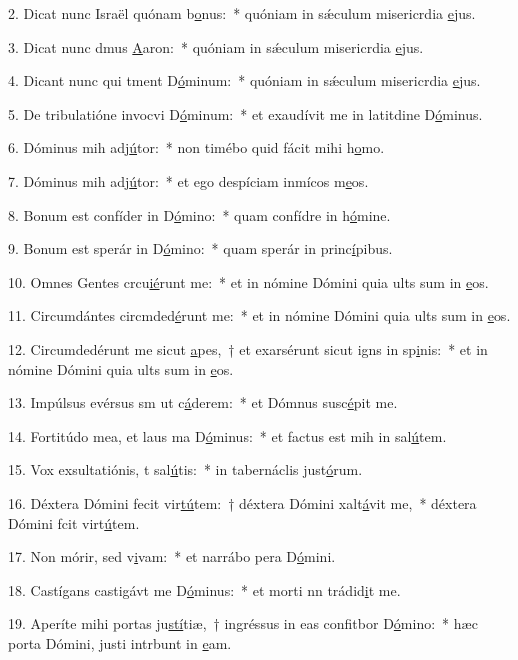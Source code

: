 2. Dicat nunc Israël quónam b\uline{o}nus:~* quóniam in sǽculum misericrdia \uline{e}jus.\par 
3. Dicat nunc dmus \uline{A}aron:~* quóniam in sǽculum misericrdia \uline{e}jus.\par 
4. Dicant nunc qui tment D\uline{ó}minum:~* quóniam in sǽculum misericrdia \uline{e}jus.\par 
5. De tribulatióne invocvi D\uline{ó}minum:~* et exaudívit me in latitdine D\uline{ó}minus.\par 
6. Dóminus mih adj\uline{ú}tor:~* non timébo quid fácit mihi h\uline{o}mo.\par 
7. Dóminus mih adj\uline{ú}tor:~* et ego despíciam inmícos m\uline{e}os.\par 
8. Bonum est confíder in D\uline{ó}mino:~* quam confídre in h\uline{ó}mine.\par 
9. Bonum est sperár in D\uline{ó}mino:~* quam sperár in princ\uline{í}pibus.\par 
10. Omnes Gentes crcu\uline{ié}runt me:~* et in nómine Dómini quia ults sum in \uline{e}os.\par 
11. Circumdántes circmded\uline{é}runt me:~* et in nómine Dómini quia ults sum in \uline{e}os.\par 
12. Circumdedérunt me sicut \uline{a}pes,~† et exarsérunt sicut igns in sp\uline{i}nis:~* et in nómine Dómini quia ults sum in \uline{e}os.\par 
13. Impúlsus evérsus sm ut c\uline{á}derem:~* et Dómnus susc\uline{é}pit me.\par 
14. Fortitúdo mea, et laus ma D\uline{ó}minus:~* et factus est mih in sal\uline{ú}tem.\par 
15. Vox exsultatiónis, t sal\uline{ú}tis:~* in tabernáclis just\uline{ó}rum.\par 
16. Déxtera Dómini fecit vir\uline{tú}tem:~† déxtera Dómini xalt\uline{á}vit me,~* déxtera Dómini fcit virt\uline{ú}tem.\par 
17. Non mórir, sed v\uline{i}vam:~* et narrábo pera D\uline{ó}mini.\par 
18. Castígans castigávt me D\uline{ó}minus:~* et morti nn trádid\uline{i}t me.\par 
19. Aperíte mihi portas ju\uline{stí}tiæ,~† ingréssus in eas confitbor D\uline{ó}mino:~* hæc porta Dómini, justi intrbunt in \uline{e}am.\par 
